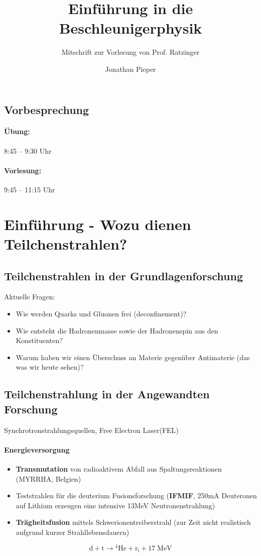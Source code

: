 \documentclass[12pt,DIV=15,a4paper,twoside,draft=false]{scrartcl}
\author{Jonathan Pieper}
\title{Einführung in die Beschleunigerphysik}
\subtitle{Mitschrift zur Vorlesung von Prof. Ratzinger}
\begin{document}
\begin{titlepage}
\maketitle
\tableofcontents
\end{titlepage}

\subsection{Vorbesprechung}
\paragraph{Übung:} 8:45 -- 9:30 Uhr
\paragraph{Vorlesung:} 9:45 -- 11:15 Uhr


\section[Einführung]{Einführung - Wozu dienen Teilchenstrahlen?}
\subsection{Teilchenstrahlen in der Grundlagenforschung}
Aktuelle Fragen:
\begin{itemize}
	\item Wie werden Quarks und Gluonen frei (deconfinement)?
	\item Wie entsteht die Hadronenmasse sowie der Hadronenspin aus den Konstituenten?
	\item Warum haben wir einen Überschuss an Materie gegenüber Antimaterie (das was wir heute sehen)?
\end{itemize}


\subsection{Teilchenstrahlung in der Angewandten Forschung}
Synchrotronstrahlungsquellen, 
Free Electron Laser(FEL)

\paragraph{Energieversorgung}
\begin{itemize}
\item  \textbf{Transmutation} von radioaktivem Abfall aus Spaltungsreaktionen (MYRRHA, Belgien)

\item Teststrahlen für die deuterium Fusionsforschung (\textbf{IFMIF}, 250\;{}mA Deuteronen auf Lithium erzeugen eine intensive 13\;{}MeV Neutronenstrahlung)

\item \textbf{Trägheitsfusion} mittels Schwerionentreiberstrahl (zur Zeit nicht realistisch aufgrund kurzer Strahllebensdauern)
\end{itemize}
$$ \mathrm{d + t \rightarrow {}^4 He + r_i + 17\;{}MeV} $$
\end{document}
